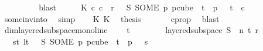 \begin{isabellebody}
\ \ \ \ \isamarkupfalse%
\ {\isacharasterisk}{\kern0pt}\ {\isacharasterisk}{\kern0pt}{\isacharasterisk}{\kern0pt}\ \isamarkupfalse%
\ blast\isanewline
\ \ \isamarkupfalse%
\ \isamarkupfalse%
\ K{}{\isacharcolon}{\kern0pt}\ {\isachardoublequoteopen}{\isasymexists}c{}{\isachardot}{\kern0pt}\ c{}\ {\isacharless}{\kern0pt}\ r\ {\isasymand}\ {\isasymchi}\ {\isacharparenleft}{\kern0pt}S\ {\isacharparenleft}{\kern0pt}SOME\ p{\isachardot}{\kern0pt}\ p{\isasymin}cube\ {}\ {\isacharparenleft}{\kern0pt}t{\isacharplus}{\kern0pt}{}{\isacharparenright}{\kern0pt}\ {\isasymand}\ p\ {}\ {\isacharequal}{\kern0pt}\ t{\isacharparenright}{\kern0pt}{\isacharparenright}{\kern0pt}\ {\isacharequal}{\kern0pt}\ c{}{\isachardoublequoteclose}\ \isanewline
\ \ \ \ \isamarkupfalse%
\ some{\isacharunderscore}{\kern0pt}inv{\isacharunderscore}{\kern0pt}into\ \isamarkupfalse%
\ simp\isanewline
\isanewline
\ \ \isamarkupfalse%
\ K{}\ K{}\ \isamarkupfalse%
\ {\isacharquery}{\kern0pt}thesis\ \isanewline
\ \ \ \ \isamarkupfalse%
\ c{}{\isacharunderscore}{\kern0pt}prop\ \isamarkupfalse%
\ blast\isanewline
{}\isamarkupfalse%
%
\endisatagproof
{\isafoldproof}%
%
\isadelimproof
\isanewline
%
\endisadelimproof
\isanewline
{}\isamarkupfalse%
\ dim{}{\isacharunderscore}{\kern0pt}layered{\isacharunderscore}{\kern0pt}subspace{\isacharunderscore}{\kern0pt}mono{\isacharunderscore}{\kern0pt}line{\isacharcolon}{\kern0pt}\ \isanewline
\ \ \ {\isachardoublequoteopen}t\ {\isachargreater}{\kern0pt}\ {}{\isachardoublequoteclose}\ \isanewline
\ \ \ \ \ {\isachardoublequoteopen}layered{\isacharunderscore}{\kern0pt}subspace\ S\ {}\ n\ t\ r\ {\isasymchi}{\isachardoublequoteclose}\isanewline
\ \ \ {\isachardoublequoteopen}{\isasymforall}s{\isacharless}{\kern0pt}t{\isachardot}{\kern0pt}\ {\isasymforall}l{\isacharless}{\kern0pt}t{\isachardot}{\kern0pt}\ \ {\isasymchi}\ {\isacharparenleft}{\kern0pt}S\ {\isacharparenleft}{\kern0pt}SOME\ p{\isachardot}{\kern0pt}\ p{\isasymin}cube\ {}\ {\isacharparenleft}{\kern0pt}t{\isacharplus}{\kern0pt}{}{\isacharparenright}{\kern0pt}\ {\isasymand}\ p\ {}\ {\isacharequal}{\kern0pt}\ s{\isacharparenright}{\kern0pt}{\isacharparenright}{\kern0pt}\ {\isacharequal}{\kern0pt}\isanewline

\end{isabellebody}
